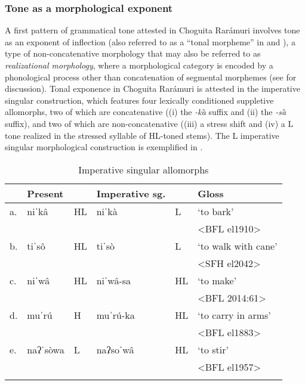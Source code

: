 \subsubsection{Tone as a morphological exponent}
\label{subsubsec: tone as realizational morphology}

A first pattern of grammatical tone attested in Choguita Rarámuri involves tone as an exponent of inflection (also referred to as a ``tonal morpheme'' in \citealt{welmers1959tonemics} and \citealt{hyman2016morphological}), a type of non-concatenative morphology that may also be referred to as \textit{realizational morphology}, where a morphological category is encoded by a phonological process other than concatenation of segmental morphemes (see \citealt{inkelas2014interplay} for discussion). Tonal exponence in Choguita Rarámuri is attested in the imperative singular construction, which features four lexically conditioned suppletive allomorphs, two of which are concatenative ((i) the \textit{-ka}̂ suffix and (ii) the \textit{-sa}̂ suffix), and two of which are non-concatenative ((iii) a stress shift and (iv) a L tone realized in the stressed syllable of HL-toned stems). The L imperative singular morphological construction is exemplified in .

\begin{table}
\caption{Imperative singular allomorphs}
\label{tab:imperative-sg-allomorphs}

\begin{tabularx}{.9\textwidth}{l lX lX l}
\lsptoprule
&\textbf{Present} &   & \textbf{Imperative sg.} &  & \textbf{Gloss}\\
\midrule
a.& niˈkâ &		HL & 	niˈkà	&	L &	‘to bark'\\
& & & & & <BFL el1910>\\
b.& tiˈsô &  	HL & 	tiˈsò     &	L & ‘to walk with cane’\\
& & & & & <SFH el2042>\\
c.& niˈwâ &		HL &	niˈwâ-sa &	HL &	`to make’\\
& & & & & <BFL 2014:61>\\
d.& muˈrú &		H &	muˈrú-ka &	HL &	`to carry in arms'\\
& & & & & <BFL el1883>\\
e.& naʔˈsòwa &	L	& naʔsoˈwâ &	HL	& ‘to stir’\\
& & & & & <BFL el1957>\\
\lspbottomrule
\end{tabularx}
\end{table}

